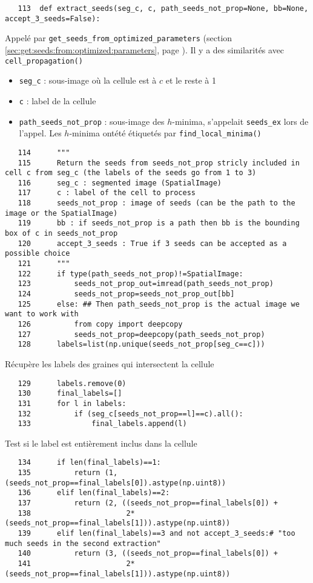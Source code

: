 \documentclass{article}
\def \mycolor {red}
\begin{document}
\begin{verbatim}
   113	def extract_seeds(seg_c, c, path_seeds_not_prop=None, bb=None, accept_3_seeds=False):
\end{verbatim} 
\color{\mycolor}
Appel\'e par \texttt{get\_seeds\_from\_optimized\_parameters} (section \ref{sec:get:seeds:from:optimized:parameters}, page \pageref{sec:get:seeds:from:optimized:parameters}). Il y a des similarit\'es avec \texttt{cell\_propagation()}
\begin{itemize}
\itemsep -0.5ex
\item \verb|seg_c| : sous-image o\`u la cellule est \`a $c$ et le reste \`a 1
\item \verb|c| : label de la cellule
\item \verb|path_seeds_not_prop| : sous-image des $h$-minima, s'appelait \verb|seeds_ex| lors de l'appel. Les $h$-minima ont\'et\'e \'etiquet\'es par \texttt{find\_local\_minima()}
\end{itemize}
\color{black}
\begin{verbatim}      
   114	    """
   115	    Return the seeds from seeds_not_prop stricly included in cell c from seg_c (the labels of the seeds go from 1 to 3)
   116	    seg_c : segmented image (SpatialImage)
   117	    c : label of the cell to process
   118	    seeds_not_prop : image of seeds (can be the path to the image or the SpatialImage)
   119	    bb : if seeds_not_prop is a path then bb is the bounding box of c in seeds_not_prop
   120	    accept_3_seeds : True if 3 seeds can be accepted as a possible choice
   121	    """
   122	    if type(path_seeds_not_prop)!=SpatialImage:
   123	        seeds_not_prop_out=imread(path_seeds_not_prop)
   124	        seeds_not_prop=seeds_not_prop_out[bb]
   125	    else: ## Then path_seeds_not_prop is the actual image we want to work with
   126	        from copy import deepcopy
   127	        seeds_not_prop=deepcopy(path_seeds_not_prop)
   128	    labels=list(np.unique(seeds_not_prop[seg_c==c]))
\end{verbatim} 
\color{\mycolor}
R\'ecup\`ere les labels des graines qui intersectent la cellule
\color{black}
\begin{verbatim}        
   129	    labels.remove(0)
   130	    final_labels=[]
   131	    for l in labels:
   132	        if (seg_c[seeds_not_prop==l]==c).all():
   133	            final_labels.append(l)    
\end{verbatim} 
\color{\mycolor}
Test si le label est enti\`erement inclus dans la cellule
\color{black}
\begin{verbatim}        
   134	    if len(final_labels)==1:
   135	        return (1, (seeds_not_prop==final_labels[0]).astype(np.uint8))
   136	    elif len(final_labels)==2:
   137	        return (2, ((seeds_not_prop==final_labels[0]) + 
   138	                    2*(seeds_not_prop==final_labels[1])).astype(np.uint8))
   139	    elif len(final_labels)==3 and not accept_3_seeds:# "too much seeds in the second extraction"
   140	        return (3, ((seeds_not_prop==final_labels[0]) + 
   141	                    2*(seeds_not_prop==final_labels[1])).astype(np.uint8))
\end{verbatim} 
\end{document}
